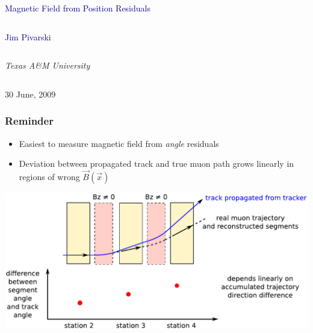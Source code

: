 \documentclass[compress]{beamer}
\begin{document}
\begin{frame}
\vfill
\begin{center}
\textcolor{darkblue}{\Large Magnetic Field from Position Residuals}

\vfill
\begin{columns}
\begin{center}
\large
\textcolor{darkblue}{Jim Pivarski}
\end{center}
\end{columns}

\begin{columns}
\begin{center}
\scriptsize
{\it Texas A\&M University}
\end{center}
\end{columns}

\vfill
30 June, 2009

\end{center}
\end{frame}


\small

\begin{frame}
\frametitle{Reminder}

\begin{itemize}
\item Easiest to measure magnetic field from {\it angle} residuals
\item Deviation between propagated track and true muon path grows
  linearly in regions of wrong $\vec{B}(\vec{x})$
\end{itemize}

\vfill
\includegraphics[width=\linewidth]{paths2.pdf}
\end{frame}
\end{document}
